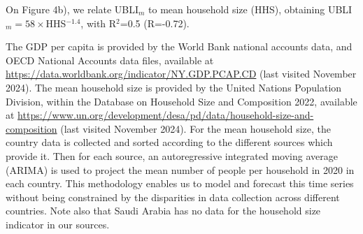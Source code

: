 \documentclass[sn-mathphys-num]{sn-jnl}%
\theoremstyle{thmstyleone}%
\theoremstyle{thmstyletwo}%
\theoremstyle{thmstylethree}%
\begin{document}
On Figure 4b), we relate UBLI$_m$ to mean household size (HHS), obtaining UBLI$_m=58\times$HHS$^{-1.4}$, with R$^2$=0.5 (R=-0.72).

 The GDP per capita is provided by the World Bank national accounts data, and OECD National Accounts data files, available at \href{https://data.worldbank.org/indicator/NY.GDP.PCAP.CD}{https://data.worldbank.org/indicator/NY.GDP.PCAP.CD} (last visited November 2024). The mean household size is provided by the United Nations Population  Division, within the Database on Household Size and Composition 2022, available at  \href{https://www.un.org/development/desa/pd/data/household-size-and-composition}{https://www.un.org/development/desa/pd/data/household-size-and-composition} (last visited November 2024). For the mean household size, the country data is collected and sorted according to the different sources which provide it. Then for each source, an autoregressive integrated moving average (ARIMA) is used to project the mean number of people per household in 2020 in each country. This methodology enables us to model and forecast this time series without being constrained by the disparities in data collection across different countries. Note  also that Saudi Arabia has no data for the household size indicator in our sources. 
\end{document}
